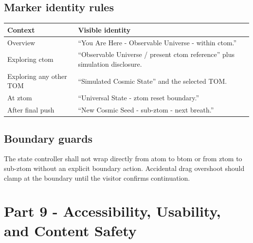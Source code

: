 \documentclass[11pt,letterpaper]{article}
\begin{document}
\subsection{Marker identity rules}
\begin{tabularx}{\textwidth}{L{1.8in}Y}
\toprule
\textbf{Context} & \textbf{Visible identity} \\
\midrule
Overview & ``You Are Here - Observable Universe - within ctom.'' \\
Exploring ctom & ``Observable Universe / present ctom reference'' plus simulation disclosure. \\
Exploring any other TOM & ``Simulated Cosmic State'' and the selected TOM. \\
At ztom & ``Universal State - ztom reset boundary.'' \\
After final push & ``New Cosmic Seed - sub-ztom - next breath.'' \\
\bottomrule
\end{tabularx}

\subsection{Boundary guards}
The state controller shall not wrap directly from atom to btom or from ztom to sub-ztom without an explicit boundary action. Accidental drag overshoot should clamp at the boundary until the visitor confirms continuation.

\section{Part 9 - Accessibility, Usability, and Content Safety}
\end{document}

